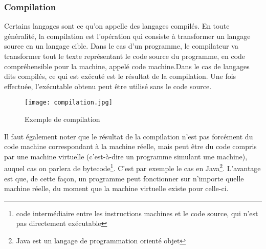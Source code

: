 \documentclass[12pt,a4paper]{article}
\begin{document}
    
    \subsubsection{Compilation}
    Certains langages sont ce qu'on appelle des langages compilés\cite{article2}. En toute généralité, la compilation est l'opération qui consiste à transformer un langage source en un langage cible. Dans le cas d'un programme, le compilateur va transformer tout le texte représentant le code source du programme, en code compréhensible pour la machine, appelé code machine.Dans le cas de langages dits compilés, ce qui est exécuté est le résultat de la compilation. Une fois effectuée, l'exécutable obtenu peut être utilisé sans le code source.\\
    
    
    \newpage
    
    
    \begin{figure}[ht]
        \centering
        \texttt{[image: compilation.jpg]}
        \caption{Exemple de compilation}
        \label{fig:Exemple de compilation}
    \end{figure}
    
    
    Il faut également noter que le résultat de la compilation n'est pas forcément du code machine correspondant à la machine réelle, mais peut être du code compris par une machine virtuelle (c'est-à-dire un programme simulant une machine), auquel cas on parlera de bytecode\footnote{code intermédiaire entre les instructions machines et le code source, qui n'est pas directement exécutable}. C'est par exemple le cas en Java\footnote{Java est un langage de programmation orienté objet}. L'avantage est que, de cette façon, un programme peut fonctionner sur n'importe quelle machine réelle, du moment que la machine virtuelle existe pour celle-ci.\\
    
    
\end{document}
